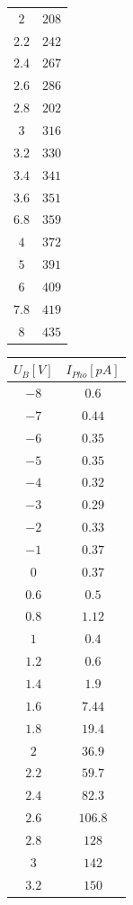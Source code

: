 \begin{center}
\begin{longtable}{c|c}
\(2\) & \( 208\) \\ 
\(2.2\) & \( 242\) \\ 
\(2.4\) & \( 267\) \\ 
\(2.6\) & \( 286\) \\ 
\(2.8\) & \( 202\) \\ 
\(3\) & \( 316\) \\ 
\(3.2\) & \( 330\) \\ 
\(3.4\) & \( 341\) \\ 
\(3.6\) & \( 351\) \\ 
\(6.8\) & \( 359\) \\ 
\(4\) & \( 372\) \\ 
\(5\) & \( 391\) \\ 
\(6\) & \( 409\) \\ 
\(7.8\) & \( 419\) \\ 
\(8\) & \( 435\) \\
\end{longtable}
\begin{longtable}{c|c}
\(U_B [V]\) & \(I_{Pho} [pA]\)\\\hline \endhead
\(-8\) & \( 0.6\) \\ 
\(-7\) & \( 0.44 \) \\ 
\(-6\) & \( 0.35 \) \\ 
\(-5\) & \( 0.35 \) \\ 
\(-4\) & \( 0.32 \) \\ 
\(-3\) & \( 0.29 \) \\ 
\(-2\) & \( 0.33 \) \\ 
\(-1\) & \( 0.37 \) \\ 
\(0\) & \( 0.37 \) \\ 
\(0.6\) & \( 0.5 \) \\ 
\(0.8\) & \( 1.12 \) \\ 
\(1\) & \( 0.4 \) \\ 
\(1.2\) & \( 0.6\) \\ 
\(1.4\) & \( 1.9 \) \\ 
\(1.6\) & \( 7.44\) \\ 
\(1.8\) & \( 19.4 \) \\ 
\(2\) & \( 36.9 \) \\ 
\(2.2\) & \( 59.7 \) \\ 
\(2.4\) & \( 82.3 \) \\ 
\(2.6\) & \( 106.8 \) \\ 
\(2.8\) & \( 128 \) \\ 
\(3\) & \( 142 \) \\ 
\(3.2\) & \( 150\) \\ 

\end{longtable}
\end{center}
